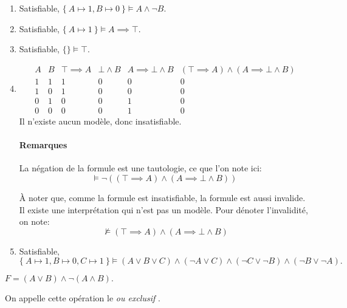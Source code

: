 \documentclass[12pt,french,a4paper]{article}
\begin{document}
\begin{question}
\begin{enumerate}

\item Satisfiable, $\{\ A \mapsto 1, B \mapsto 0\ \} \vDash A \wedge \neg B.$
\item Satisfiable, $\{\ A \mapsto 1\ \} \vDash A \implies \top.$
\item Satisfiable, $\{ \} \vDash \top.$

\item\begin{displaymath}
\begin{array}{cc|cccc}
A & B & \top \implies A & \bot \wedge B &  A \implies \bot \wedge B &  (\top \implies A) \wedge( A \implies \bot \wedge B) \\
\hline
1 & 1 & 1 & 0 & 0 & 0\\
1 & 0 & 1 & 0 & 0 & 0\\
0 & 1 & 0 & 0 & 1 & 0\\
0 & 0 & 0 & 0 & 1 & 0
\end{array}
\end{displaymath}
Il n'existe aucun modèle, donc insatisfiable.

\paragraph{Remarques}
La négation de la formule est une tautologie, ce que l'on note ici:
\[
\vDash \neg ((\top \implies A) \wedge( A \implies \bot \wedge B))\
\]

À noter que, comme la formule est insatisfiable, la formule est aussi invalide. Il existe une interprétation qui n'est pas un modèle. Pour dénoter l'invalidité, on note:
\[\not \vDash (\top \implies A) \wedge( A \implies \bot \wedge B)\]

\item Satisfiable, $\{\ A \mapsto 1, B \mapsto 0, C \mapsto 1\ \} \vDash (A \vee B \vee C) \wedge (\neg A \vee C) \wedge (\neg C \vee \neg B) \wedge (\neg B \vee \neg A).$

\end{enumerate}
\end{question}


\begin{question}
$F = (A \vee B) \wedge \neg (A \wedge B).$

On appelle cette opération le \og \textit{ou exclusif} \fg{}.
\end{question}
\end{document}
